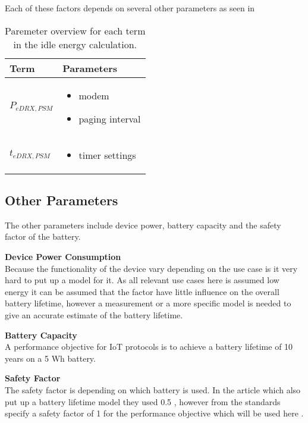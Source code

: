 Each of these factors depends on several other parameters as seen in 

\begin{table}[H]
\centering
\begin{tabular}{|m{3cm}|m{6cm}|} \hline
\textbf{Term} & \textbf{Parameters} \\ \hline
$P_{eDRX,PSM}$ & \begin{itemize}
\item modem
\item paging interval
\end{itemize}  \\ \hline
$t_{eDRX,PSM}$ & \begin{itemize}
\item timer settings
\end{itemize}  \\ \hline
\end{tabular}
\caption{Paremeter overview for each term in the idle energy calculation.}
\label{tab:Eidle_parameter_overview}
\end{table}



\subsection{Other Parameters}
The other parameters include device power, battery capacity and the safety factor of the battery.

\textbf{Device Power Consumption}\\
Because the functionality of the device vary depending on the use case is it very hard to put up a model for it. As all relevant use cases here is assumed low energy it can be assumed that the factor have little influence on the overall battery lifetime, however a measurement or a more specific model is needed to give an accurate estimate of the battery lifetime.

\textbf{Battery Capacity}\\
A performance objective for IoT protocols is to achieve a battery lifetime of 10 years on a 5 Wh battery. 

\textbf{Safety Factor}\\
The safety factor is depending on which battery is used. In the article which also put up a battery lifetime model they used 0.5 \citep{Power_article}, however from the standards specify a safety factor of 1 for the performance objective which will be used here \citep[Sec. 5.4]{safty_factor_standard}.




